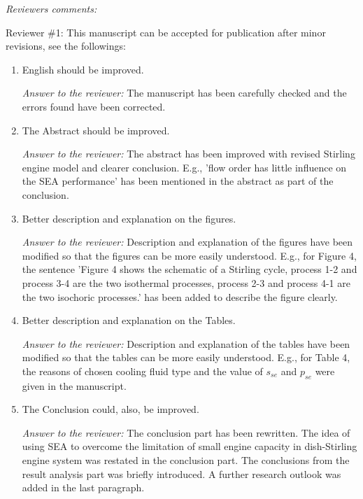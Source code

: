 \documentclass[12pt]{letter}
\begin{document}
\emph{Reviewers comments:}

Reviewer \#1:  This manuscript can be accepted for publication after minor revisions, see the followings:

\begin{enumerate}
\item English should be improved.

\begin{snugshade*}
\emph{Answer to the reviewer:} The manuscript has been carefully checked and the errors found have been corrected.
\end{snugshade*}

\item The Abstract should be improved.

\begin{snugshade*}
\emph{Answer to the reviewer:} The abstract has been improved with revised Stirling engine model and clearer conclusion. E.g., 'flow order has little influence on the SEA performance' has been mentioned in the abstract as part of the conclusion.
\end{snugshade*}

\item Better description and explanation on the figures.

\begin{snugshade*}
\emph{Answer to the reviewer:} Description and explanation of the figures have been modified so that the figures can be more easily understood. E.g., for Figure 4, the sentence 'Figure 4 shows the schematic of a Stirling cycle, process 1-2 and process 3-4 are the two isothermal processes, process 2-3 and process 4-1 are the two isochoric processes.' has been added to describe the figure clearly.
\end{snugshade*}

\item Better description and explanation on the Tables.

\begin{snugshade*}
\emph{Answer to the reviewer:} Description and explanation of the tables have been modified so that the tables can be more easily understood. E.g., for Table 4, the reasons of chosen cooling fluid type and the value of $s_{se}$ and $p_{se}$ were given in the manuscript.
\end{snugshade*}

\item The Conclusion could, also, be improved.

\begin{snugshade*}
\emph{Answer to the reviewer:} The conclusion part has been rewritten. The idea of using SEA to overcome the limitation of small engine capacity in dish-Stirling engine system was restated in the conclusion part. The conclusions from the result analysis part was briefly introduced. A further research outlook was added in the last paragraph.
\end{snugshade*}


\end{enumerate}
\end{document}

